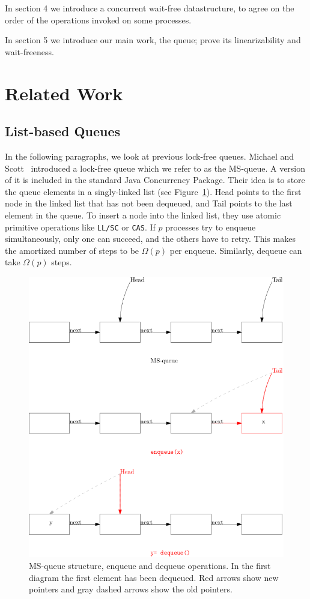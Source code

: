 \documentclass[10pt]{article}
\theoremstyle{definition}
\begin{document}
In section 4 we introduce a concurrent wait-free datastructure, to agree on the order of the operations invoked on some processes.

In section 5 we introduce our main work, the queue; prove its linearizability and wait-freeness.

\section{Related Work}
\subsection{List-based Queues}
In the following paragraphs, we look at previous lock-free queues.
Michael and Scott~\cite{DBLP:conf/podc/MichaelS96} introduced a lock-free queue which we refer to as the MS-queue. A version of it is included in the standard Java Concurrency Package. Their idea is to store the queue elements in a singly-linked list (see Figure~\ref{fig::msq}). Head points to the first node in the linked list that has not been dequeued, and Tail points to the last element in the queue. To insert a node into the linked list, they use atomic primitive operations like \texttt{LL/SC} or \texttt{CAS}. If $p$ processes try to enqueue simultaneously, only one can succeed, and the others have to retry. This makes the amortized number of steps to be $\Omega(p)$ per enqueue. Similarly, dequeue can take $\Omega(p)$ steps.

\begin{figure}[hbt]
  \center\includegraphics[scale=0.4]{pics/msqueue}
  \caption{\label{fig::msq}MS-queue structure, enqueue and dequeue operations. In the first diagram the first element has been dequeued. Red arrows show new pointers and gray dashed arrows show the old pointers.}
\end{figure}
\end{document}
